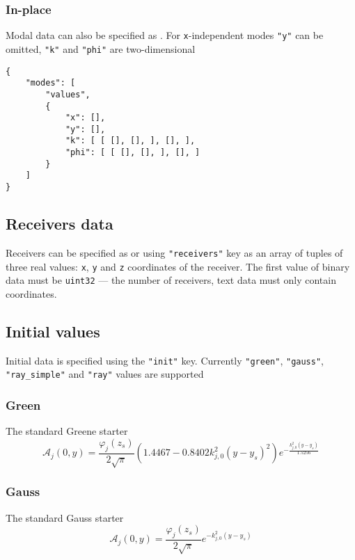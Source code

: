 \documentclass[12pt]{extarticle}
\newcommand{\code}[1]{\colorbox{gray!10}{\texttt{#1}}}
\begin{document}
            \subsubsection{In-place}
                \par Modal data can also be specified as . For \code{x}-independent modes \code{"y"} can be omitted, \code{"k"} and \code{"phi"} are two-dimensional
                \begin{verbatim}
{
    "modes": [
        "values",
        {
            "x": [],
            "y": [],
            "k": [ [ [], [], ], [], ],
            "phi": [ [ [], [], ], [], ]
        }
    ]
}
                \end{verbatim}
        \subsection{Receivers data}
            \par Receivers can be specified as  or  using \code{"receivers"} key as an array of tuples of three real values: \code{x}, \code{y} and \code{z} coordinates of the receiver. The first value of binary data must be \code{uint32} --- the number of receivers, text data must only contain coordinates.
        \subsection{Initial values}
            \par Initial data is specified using the \code{"init"} key. Currently \code{"green"}, \code{"gauss"}, \code{"ray_simple"} and \code{"ray"} values are supported
            \subsubsection{Green}
                \par The standard Greene starter
                \begin{equation*}
                    \mathcal{A}_j\left(0, y\right)=\frac{\varphi_j\left(z_s\right)}{2\sqrt{\pi}}\left(1.4467-0.8402k_{j,0}^2\left(y-y_s\right)^2\right)e^{-\frac{k_{j,0}^2\left(y-y_s\right)}{1.5256}}
                \end{equation*}
            \subsubsection{Gauss}
                \par The standard Gauss starter
                \begin{equation*}
                    \mathcal{A}_j\left(0, y\right)=\frac{\varphi_j\left(z_s\right)}{2\sqrt{\pi}}e^{-k_{j,0}^2\left(y-y_s\right)}
                \end{equation*}
\end{document}
